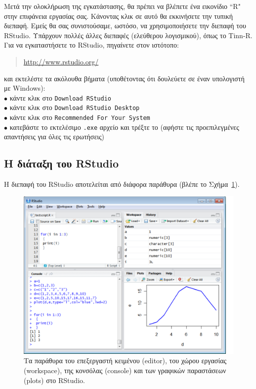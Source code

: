 \documentclass[a4paper,10pt,twocolumn]{article}
\makeatletter
\let\SF@@footnote\footnote
\def\footnote{\ifx\protect\@typeset@protect
 \expandafter\SF@@footnote
 \else
 \expandafter\SF@gobble@opt
 \fi
}
\edef\SF@gobble@opt{\noexpand\protect
 \expandafter\noexpand\csname SF@gobble@opt \endcsname}
\makeatother
\begin{document}
Μετά την ολοκλήρωση της εγκατάστασης, θα πρέπει να βλέπετε ένα εικονίδιο ``R" στην επιφάνεια
εργασίας σας. Κάνοντας κλικ σε αυτό θα εκκινήσετε την τυπική διεπαφή. Εμείς θα σας συνιστούσαμε,
ωστόσο, να χρησιμοποιήσετε την διεπαφή του RStudio. \footnote{Υπάρχουν πολλές άλλες διεπαφές
(ελεύθερου λογισμικού), όπως το Tinn-R.} Για να εγκαταστήσετε το RStudio, πηγαίνετε στον ιστότοπο: 
\begin{quote}
  \url{http://www.rstudio.org/}
\end{quote}
και εκτελέστε τα ακόλουθα βήματα (υποθέτοντας ότι δουλεύετε σε έναν υπολογιστή με Windows):\\
\noindent $\bullet$ κάντε κλικ στο \texttt{Download RStudio}\\
\noindent $\bullet$ κάντε κλικ στο \texttt{Download RStudio Desktop}\\
\noindent $\bullet$ κάντε κλικ στο \texttt{Recommended For Your System}\\
\noindent $\bullet$ κατεβάστε το εκτελέσιμο \texttt{.exe} αρχείο και τρέξτε το 
(αφήστε τις προεπιλεγμένες απαντήσεις για όλες τις ερωτήσεις)

\subsection{Η διάταξη του RStudio}

Η διεπαφή του RStudio αποτελείται από διάφορα παράθυρα (βλέπε το Σχήμα~\ref{fig:screenshot}).

\begin{figure}[htb]
  \centering
  \includegraphics[width=13cm, clip=true, trim=0cm 0cm 9mm 0cm]{img/rstudio_screenshot.pdf}
  \caption{Τα παράθυρα του επεξεργαστή κειμένου (editor), του χώρου εργασίας (workspace), 
  της κονσόλας (console) και των γραφικών παραστάσεων (plots) στο RStudio.}
  \label{fig:screenshot}
\end{figure}
\end{document}
